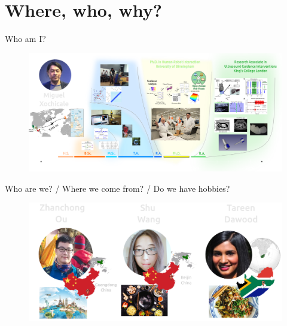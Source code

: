 \section{Where, who, why?}



{
\begin{frame}{Who am I?}

  \begin{figure}
  \centering
  \includegraphics[width=1.0\textwidth]{./figures/miguel-xochicale/versions/drawing-v03.png}
  \end{figure}

\end{frame}
}



{
\begin{frame}{Who are we? / Where we come from? / Do we have hobbies?}

  \begin{figure}
  \centering
  \includegraphics[width=1.0\textwidth]{./figures/who-we-are/versions/drawing-v06.png}
  \end{figure}

\end{frame}
}




